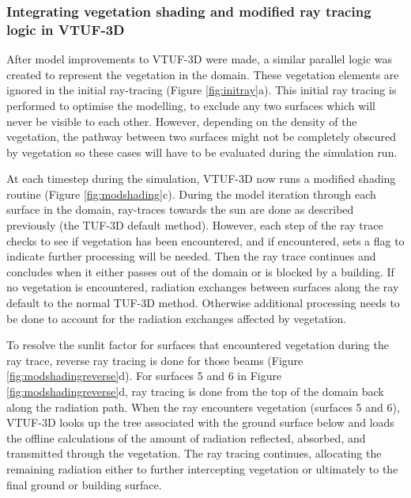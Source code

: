 \documentclass[final,3p,times,authoryear]{elsarticle}
\begin{document}
\subsubsection{Integrating vegetation shading and modified ray tracing logic in VTUF-3D}\label{sec:Representationofvegetation}

After model improvements to VTUF-3D were made, a similar parallel logic was created to represent the vegetation in the domain. These vegetation elements are ignored in the initial ray-tracing (Figure \ref{fig:initray}a). This initial ray tracing is performed to optimise the modelling, to exclude any two surfaces which will never be visible to each other. However, depending on the density of the vegetation, the pathway between two surfaces might not be completely obscured by vegetation so these cases will have to be evaluated during the simulation run.

At each timestep during the simulation, VTUF-3D now runs a modified shading routine (Figure \ref{fig:modshading}c). During the model iteration through each surface in the domain, ray-traces towards the sun are done as described previously (the TUF-3D default method). However, each step of the ray trace checks to see if vegetation has been encountered, and if encountered, sets a flag to indicate further processing will be needed. Then the ray trace continues and concludes when it either passes out of the domain or is blocked by a building. If no vegetation is encountered, radiation exchanges between surfaces along the ray default to the normal TUF-3D method. Otherwise additional processing needs to be done to account for the radiation exchanges affected by vegetation.

To resolve the sunlit factor for surfaces that encountered vegetation during the ray trace, reverse ray tracing is done for those beams (Figure \ref{fig:modshadingreverse}d). For surfaces 5 and 6 in Figure \ref{fig:modshadingreverse}d, ray tracing is done from the top of the domain back along the radiation path. When the ray encounters vegetation (surfaces 5 and 6), VTUF-3D looks up the tree associated with the ground surface below and loads the offline calculations of the amount of radiation reflected, absorbed, and transmitted through the vegetation. The ray tracing continues, allocating the remaining radiation either to further intercepting vegetation or ultimately to the final ground or building surface.
\end{document}
